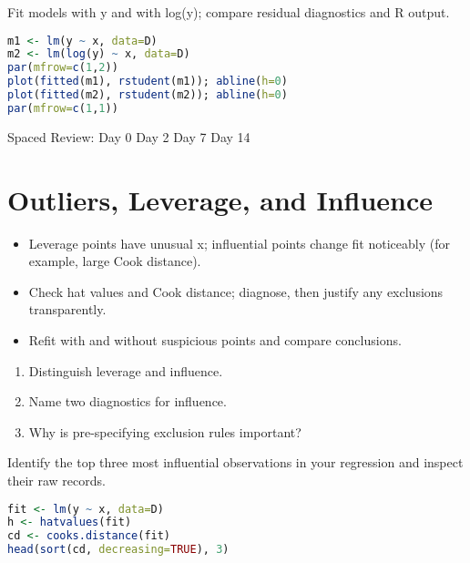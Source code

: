 \documentclass[11pt,a4paper]{article}
\def\textbf#1{#1}%
\newcommand{\reviewticks}{
  \vspace{0.4em}
  \noindent\scriptsize\textbf{Spaced Review:}
  \fbox{\phantom{D0}} Day 0\quad
  \fbox{\phantom{D2}} Day 2\quad
  \fbox{\phantom{D7}} Day 7\quad
  \fbox{\phantom{D14}} Day 14
}
\begin{document}
\begin{practicebox}
Fit models with y and with log(y); compare residual diagnostics and R output.
\end{practicebox}

\begin{rbox}
\begin{lstlisting}[language=R]
m1 <- lm(y ~ x, data=D)
m2 <- lm(log(y) ~ x, data=D)
par(mfrow=c(1,2))
plot(fitted(m1), rstudent(m1)); abline(h=0)
plot(fitted(m2), rstudent(m2)); abline(h=0)
par(mfrow=c(1,1))
\end{lstlisting}
\end{rbox}

\reviewticks

\section{Outliers, Leverage, and Influence}

\begin{corebox}
\begin{itemize}
  \item Leverage points have unusual x; influential points change fit noticeably (for example, large Cook distance).
  \item Check hat values and Cook distance; diagnose, then justify any exclusions transparently.
  \item Refit with and without suspicious points and compare conclusions.
\end{itemize}
\end{corebox}

\begin{recallbox}
\begin{enumerate}
  \item Distinguish leverage and influence.
  \item Name two diagnostics for influence.
  \item Why is pre-specifying exclusion rules important?
\end{enumerate}
\end{recallbox}

\begin{practicebox}
Identify the top three most influential observations in your regression and inspect their raw records.
\end{practicebox}

\begin{rbox}
\begin{lstlisting}[language=R]
fit <- lm(y ~ x, data=D)
h <- hatvalues(fit)
cd <- cooks.distance(fit)
head(sort(cd, decreasing=TRUE), 3)
\end{lstlisting}
\end{rbox}
\end{document}
